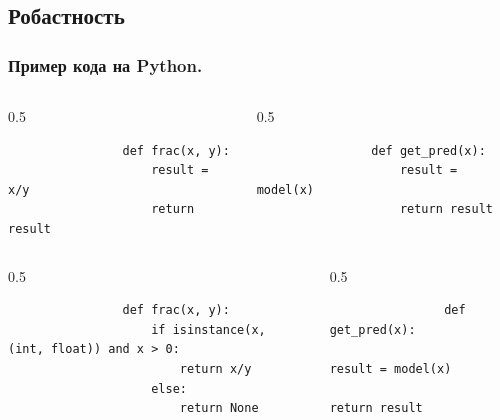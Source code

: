 \subsection{Робастность}
\begin{frame}[fragile]
    \frametitle{Пример кода на Python.}
    \begin{example*}
        \begin{columns}[onlytextwidth,t]
            \begin{column}{0.5\textwidth}
                \begin{verbatim}
                def frac(x, y):
                    result = x/y
                    return result
                \end{verbatim}
            \end{column}
            \begin{column}{0.5\textwidth}
                \begin{verbatim}
                def get_pred(x):
                    result = model(x)
                    return result
                \end{verbatim}
            \end{column}
        \end{columns}
    \end{example*}
    \begin{example*}
        \begin{columns}[onlytextwidth,t]
            \begin{column}{0.5\textwidth}
                \begin{verbatim}
                def frac(x, y):
                    if isinstance(x, (int, float)) and x > 0:
                        return x/y
                    else:
                        return None
                \end{verbatim}
            \end{column}
            \begin{column}{0.5\textwidth}
                \begin{verbatim}
                def get_pred(x):
                    result = model(x)
                    return result
                \end{verbatim}
            \end{column}
        \end{columns}
    \end{example*}
\end{frame}

